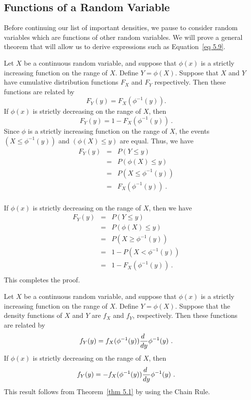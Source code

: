 \subsection*{Functions of a Random Variable} 
Before continuing our list of important
densities, we pause to consider random variables which are  functions of other random
variables.  We will prove a general theorem that will allow us to derive expressions
such as Equation~\ref{eq 5.9}.
\par
\begin{theorem}\label{thm 5.1} Let $X$ be a continuous random variable, and suppose
that $\phi(x)$ is a strictly increasing function on the range of $X$.  Define $Y =
\phi(X)$.  Suppose that $X$ and $Y$ have cumulative distribution  functions $F_X$ and
$F_Y$ respectively.  Then these functions are related by
$$ F_Y(y) = F_X(\phi^{-1}(y)).
$$ If $\phi(x)$ is strictly decreasing on the range of $X$, then
$$F_Y(y) = 1 - F_X(\phi^{-1}(y))\ .$$
\proof Since $\phi$ is a strictly increasing function on the range of $X$, the events
$(X \le
\phi^{-1}(y))$  and $(\phi(X) \le y)$ are equal.  Thus, we have
\begin{eqnarray*} F_Y(y) & = & P(Y \le y) \\ & = & P(\phi(X) \le y) \\ & = & P(X \le
\phi^{-1}(y)) \\ & = & F_X(\phi^{-1}(y))\ . \\
\end{eqnarray*}
\par If $\phi(x)$ is strictly decreasing on the range of $X$, then we have
\begin{eqnarray*} F_Y(y) & = & P(Y \leq y) \\
       & = & P(\phi(X) \leq y) \\
       & = & P(X \geq \phi^{-1}(y)) \\
       & = & 1 - P(X < \phi^{-1}(y)) \\
       & = & 1 - F_X(\phi^{-1}(y))\ . \\
\end{eqnarray*} This completes the proof.
\end{theorem}
\begin{corollary}\label{cor 5.1} Let $X$ be a continuous random variable, and suppose
that $\phi(x)$ is a strictly increasing function on the range of $X$.  Define $Y =
\phi(X)$.  Suppose that the density functions of $X$ and $Y$ are
$f_X$  and $f_Y$, respectively.  Then these functions are related by
$$f_Y(y) = f_X(\phi^{-1}(y)){{d\ }\over{dy}}\phi^{-1}(y)\ .$$  If $\phi(x)$
is strictly decreasing on the range of $X$, then
$$f_Y(y) = -f_X(\phi^{-1}(y)){{d\ }\over{dy}}\phi^{-1}(y)\ .$$
\proof This result follows from Theorem~\ref{thm 5.1} by using the Chain
Rule.
\end{corollary} 
